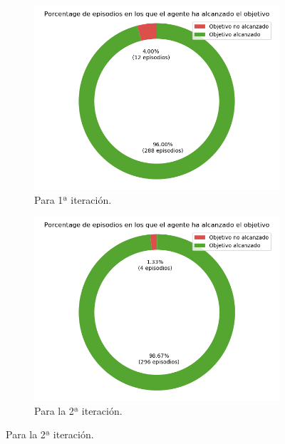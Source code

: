\begin{figure}
    \centering
    \begin{subfigure}{.5\textwidth}
        \centering
        \includegraphics[scale=0.3]{cap5_experimentacion/images/CHANGE_ORIGIN-20_09-00_54-1, 2, 0_it1_porcentajeResuelto.png}
        \caption{Para 1ª iteración.}
        \label{fig:CHANGE_ORIGIN-20_09-00_54-1, 2, 0_it1_porcentajeResuelto}
    \end{subfigure}%
    \begin{subfigure}{.5\textwidth}
        \centering
        \includegraphics[scale=0.3]{cap5_experimentacion/images/CHANGE_ORIGIN-20_09-00_54-1, 2, 0_it2_porcentajeResuelto.png}
        \caption{Para la 2ª iteración.}
        \label{fig:CHANGE_ORIGIN-20_09-00_54-1, 2, 0_it2_porcentajeResuelto}

\end{subfigure}
\end{figure}
